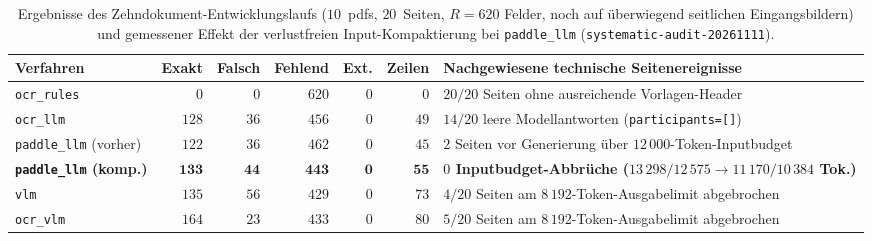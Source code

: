 \begin{table}[htbp]
  \centering
  \caption[Ergebnisse des Zehndokument-Entwicklungslaufs und Input-Kompaktierung]{Ergebnisse des Zehndokument-Entwicklungslaufs ($10$~\acp{pdf}, $20$~Seiten, $R = 620$ Felder, noch auf überwiegend seitlichen Eingangsbildern) und gemessener Effekt der verlustfreien Input-Kompaktierung bei \texttt{paddle\_llm} (\texttt{systematic-audit-20261111}).}
  \label{tab:zehndokument-audit}
  \footnotesize
  \setlength{\tabcolsep}{4pt}
  \begin{tabularx}{\textwidth}{@{}>{\raggedright\arraybackslash}p{} r r r r r >{\raggedright\arraybackslash}X@{}}
    \toprule
    \textbf{Verfahren} & \textbf{Exakt} & \textbf{Falsch} & \textbf{Fehlend} & \textbf{Ext.} & \textbf{Zeilen} & \textbf{Nachgewiesene technische Seitenereignisse} \\
    \midrule
    \texttt{ocr\_rules} & $0$ & $0$ & $620$ & $0$ & $0$ & $20/20$ Seiten ohne ausreichende Vorlagen-Header \\
    \texttt{ocr\_llm} & $128$ & $36$ & $456$ & $0$ & $49$ & $14/20$ leere Modellantworten (\texttt{participants=[]}) \\
    \texttt{paddle\_llm} (vorher) & $122$ & $36$ & $462$ & $0$ & $45$ & $2$ Seiten vor Generierung über $12\,000$-Token-Inputbudget \\
    \textbf{\texttt{paddle\_llm} (komp.)} & $\mathbf{133}$ & $\mathbf{44}$ & $\mathbf{443}$ & $\mathbf{0}$ & $\mathbf{55}$ & \textbf{$0$ Inputbudget-Abbrüche ($13\,298/12\,575 \rightarrow 11\,170/10\,384$ Tok.)} \\
    \texttt{vlm} & $135$ & $56$ & $429$ & $0$ & $73$ & $4/20$ Seiten am $8\,192$-Token-Ausgabelimit abgebrochen \\
    \texttt{ocr\_vlm} & $164$ & $23$ & $433$ & $0$ & $80$ & $5/20$ Seiten am $8\,192$-Token-Ausgabelimit abgebrochen \\
    \bottomrule
  \end{tabularx}
\end{table}

